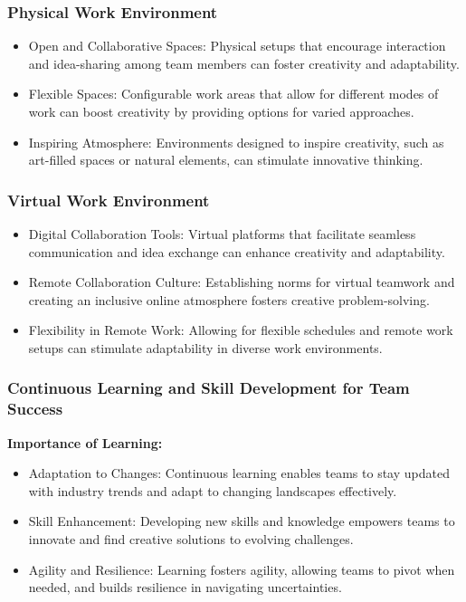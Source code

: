\documentclass[a4paper, twoside]{article}
\begin{document}
\subsubsection{Physical Work Environment}

\begin{itemize}
    \item{Open and Collaborative Spaces:} Physical setups that encourage interaction and idea-sharing among team members can foster creativity and adaptability.
    \item{Flexible Spaces:} Configurable work areas that allow for different modes of work can boost creativity by providing options for varied approaches.
    \item{Inspiring Atmosphere:} Environments designed to inspire creativity, such as art-filled spaces or natural elements, can stimulate innovative thinking.
\end{itemize}

\subsubsection{Virtual Work Environment}

\begin{itemize}
    \item{Digital Collaboration Tools:} Virtual platforms that facilitate seamless communication and idea exchange can enhance creativity and adaptability.
    \item{Remote Collaboration Culture:} Establishing norms for virtual teamwork and creating an inclusive online atmosphere fosters creative problem-solving.
    \item{Flexibility in Remote Work:} Allowing for flexible schedules and remote work setups can stimulate adaptability in diverse work environments.
\end{itemize}

\subsubsection{Continuous Learning and Skill Development for Team Success}

\textbf{Importance of Learning:}
\begin{itemize}
    \item{Adaptation to Changes:} Continuous learning enables teams to stay updated with industry trends and adapt to changing landscapes effectively.
    \item{Skill Enhancement:} Developing new skills and knowledge empowers teams to innovate and find creative solutions to evolving challenges.
    \item{Agility and Resilience:} Learning fosters agility, allowing teams to pivot when needed, and builds resilience in navigating uncertainties.
\end{itemize}
\end{document}
